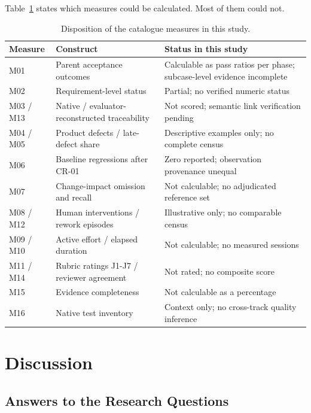 \documentclass[conference]{IEEEtran}
\begin{document}
Table~\ref{tbl-metrics} states which measures could be calculated.
Most of them could not.

\begin{table}[htbp]
\caption{Disposition of the catalogue measures in this study.}\label{tbl-metrics}
\centering\footnotesize
\begin{tabular}{p{} p{} p{}}
\hline
\textbf{Measure} & \textbf{Construct} & \textbf{Status in this study} \\
\hline
M01 & Parent acceptance outcomes & Calculable as pass ratios per phase; subcase-level evidence incomplete \\
M02 & Requirement-level status & Partial; no verified numeric status \\
M03 / M13 & Native / evaluator-reconstructed traceability & Not scored; semantic link verification pending \\
M04 / M05 & Product defects / late-defect share & Descriptive examples only; no complete census \\
M06 & Baseline regressions after CR-01 & Zero reported; observation provenance unequal \\
M07 & Change-impact omission and recall & Not calculable; no adjudicated reference set \\
M08 / M12 & Human interventions / rework episodes & Illustrative only; no comparable census \\
M09 / M10 & Active effort / elapsed duration & Not calculable; no measured sessions \\
M11 / M14 & Rubric ratings J1-J7 / reviewer agreement & Not rated; no composite score \\
M15 & Evidence completeness & Not calculable as a percentage \\
M16 & Native test inventory & Context only; no cross-track quality inference \\
\hline
\end{tabular}
\end{table}

\section{Discussion}\label{discussion}

\subsection{Answers to the Research
Questions}\label{answers-to-the-research-questions}
\end{document}
